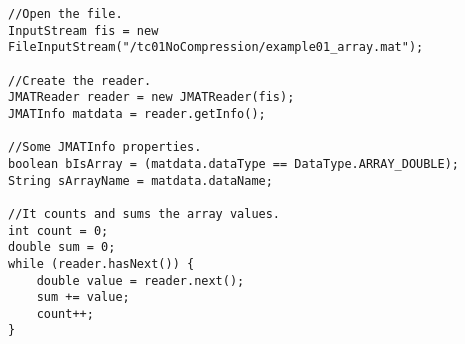 \begin{lstlisting}[style=myJavaStyle]
//Open the file.
InputStream fis = new FileInputStream("/tc01NoCompression/example01_array.mat");
		
//Create the reader.
JMATReader reader = new JMATReader(fis);
JMATInfo matdata = reader.getInfo();
		
//Some JMATInfo properties.
boolean bIsArray = (matdata.dataType == DataType.ARRAY_DOUBLE);
String sArrayName = matdata.dataName;
	
//It counts and sums the array values.
int count = 0;
double sum = 0;
while (reader.hasNext()) {
	double value = reader.next();
	sum += value;
	count++;
}
\end{lstlisting}